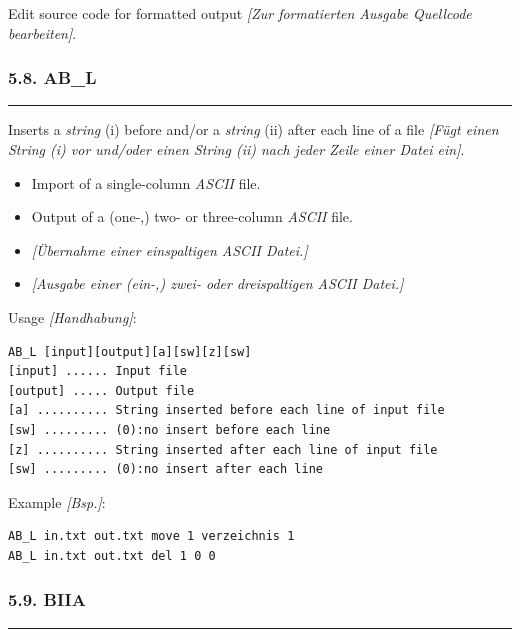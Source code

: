 \documentclass[
]{article}
\begin{document}
Edit source code for formatted output \emph{{[}Zur formatierten Ausgabe
Quellcode bearbeiten{]}}.

\hypertarget{ab_l}{%
\subsubsection{5.8. AB\_L}\label{ab_l}}

\begin{center}\rule{0.5\linewidth}{0.5pt}\end{center}

Inserts a \emph{string} (i) before and/or a \emph{string} (ii) after
each line of a file \emph{{[}Fügt einen String (i) vor und/oder einen
String (ii) nach jeder Zeile einer Datei ein{]}}.

\begin{itemize}
\item
  Import of a single-column \emph{ASCII} file.
\item
  Output of a (one-,) two- or three-column \emph{ASCII} file.
\item
  \emph{{[}Übernahme einer einspaltigen ASCII Datei.{]}}
\item
  \emph{{[}Ausgabe einer (ein-,) zwei- oder dreispaltigen ASCII
  Datei.{]}}
\end{itemize}

Usage \emph{{[}Handhabung{]}}:

\begin{verbatim}
AB_L [input][output][a][sw][z][sw]
[input] ...... Input file 
[output] ..... Output file
[a] .......... String inserted before each line of input file
[sw] ......... (0):no insert before each line 
[z] .......... String inserted after each line of input file
[sw] ......... (0):no insert after each line
\end{verbatim}

Example \emph{{[}Bsp.{]}}:

\begin{verbatim}
AB_L in.txt out.txt move 1 verzeichnis 1
AB_L in.txt out.txt del 1 0 0
\end{verbatim}

\hypertarget{biia}{%
\subsubsection{5.9. BIIA}\label{biia}}

\begin{center}\rule{0.5\linewidth}{0.5pt}\end{center}
\end{document}
